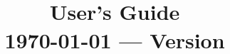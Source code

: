 \title{\textbf{\Huge \akantu}\\
  \vspace{0.5cm}
  \textbf{\huge User's Guide}\\
  \vspace{1cm}
  {\small \today{} --- Version \version}
}

\author{}
\date{}

\makeindex



\setcounter{page}{1}
\renewcommand{\thepage}{\roman{page}}

\label{maintitlepage}
\maketitle

\tableofcontents

\ifodd\value{page} \insertblankpage
\else \insertblankpage\insertblankpage \fi

\setcounter{page}{1}
\renewcommand\thepage{\arabic{page}}
